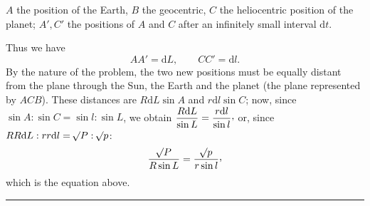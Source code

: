 \(A\) the position of the Earth, \(B\) the geocentric, \(C\) the heliocentric position of the planet; \(A',C'\) the positions of \(A\) and \(C\) after an infinitely small interval \(\mathrm{d}t\).

Thus we have
\[
AA'=\mathrm{d}L,\qquad CC'=\mathrm{d}l.
\]
By the nature of the problem, the two new positions must be equally distant from the plane through the Sun, the Earth and the planet (the plane represented by \(ACB\)). These distances are \(R\mathrm{d}L\sin A\) and \(r\mathrm{d}l\sin C\); now, since \(\sin A:\sin C=\sin l:\sin L\), we obtain \(\dfrac{R\mathrm{d}L}{\sin L}=\dfrac{r\mathrm{d}l}{\sin l}\mathpunct{\raisebox{.45ex}{,}}\) or, since \(RR\mathrm{d}L:rr\mathrm{d}l=\mathord{{}^{}\!\surd}P:\mathord{{}^{}\!\surd}p\):
\[
\frac{\BareRoot{P}}{R\sin L}=\frac{\BareRoot{p}}{r\sin l}\mathpunct{\raisebox{.45ex}{,}}
\]
which is the equation above.
\begin{center}\rule{.18\textwidth}{.35pt}\end{center}
